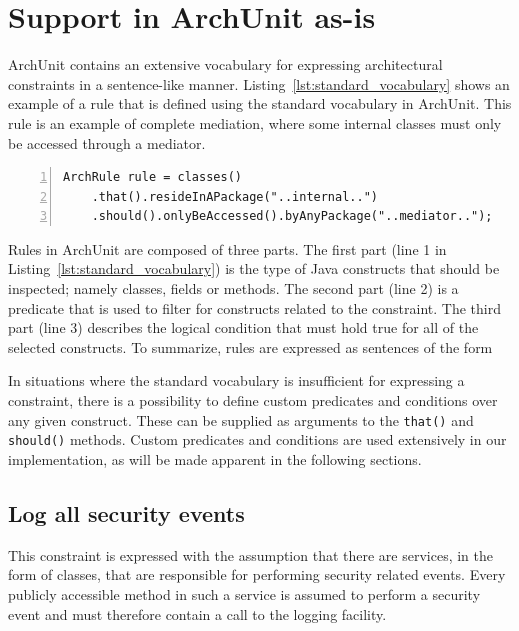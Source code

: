\section{Support in ArchUnit as-is}\label{sec:as-is}
ArchUnit contains an extensive vocabulary for expressing architectural constraints in a sentence-like manner. Listing~\ref{lst:standard_vocabulary} shows an example of a rule that is defined using the standard vocabulary in ArchUnit. This rule is an example of complete mediation, where some internal classes must only be accessed through a mediator.

\begin{minipage}{\linewidth}
\begin{lstlisting}[caption={Example of a rule that is expressed with the standard vocabulary.}, captionpos=b, label=lst:standard_vocabulary, numbers=left]
ArchRule rule = classes()
    .that().resideInAPackage("..internal..")
    .should().onlyBeAccessed().byAnyPackage("..mediator..");
\end{lstlisting}
\end{minipage}

Rules in ArchUnit are composed of three parts. The first part (line 1 in Listing~\ref{lst:standard_vocabulary}) is the type of Java constructs that should be inspected; namely classes, fields or methods. The second part (line 2) is a predicate that is used to filter for constructs related to the constraint. The third part (line 3) describes the logical condition that must hold true for all of the selected constructs. To summarize, rules are expressed as sentences of the form 


In situations where the standard vocabulary is insufficient for expressing a constraint, there is a possibility to define custom predicates and conditions over any given construct. These can be supplied as arguments to the \texttt{that()} and \texttt{should()} methods. Custom predicates and conditions are used extensively in our implementation, as will be made apparent in the following sections.

\subsection{Log all security events}
This constraint is expressed with the assumption that there are services, in the form of classes, that are responsible for performing security related events. Every publicly accessible method in such a service is assumed to perform a security event and must therefore contain a call to the logging facility.

